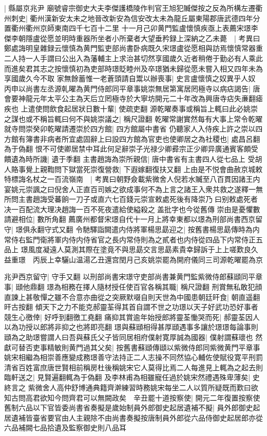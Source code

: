 |{
	縣屬京兆尹}
廟號睿宗御史大夫李傑護橋陵作判官王旭犯贓傑按之反為所構左遷衢州刺史|{
	衢州漢新安太未之地晉改新安為信安改太未為龍丘屬東陽郡唐武德四年分置衢州衢州京師東南四千七百十二里}
十一月己卯黄門監盧懷慎疾亟上表薦宋璟李傑李朝隱盧從愿並明時重器所坐者小所棄者大望垂矜録上深納之乙未薨　|{
	考異曰鄭處誨明皇雜録云懷慎為黄門監吏部尚書卧病既久宋璟盧從愿相與訪焉懷慎常器重二人持一人手謂曰公出入為藩輔主上求治甚切然享國歲久近者稍倦于勤必有人乘此而進矣君其志之按懷慎初為吏部時璟貶睦州及卒璟猶未歸從愿未嘗入相又四年未為享國歲久今不取}
家無餘蓄惟一老蒼頭請自鬻以辦喪事|{
	史言盧懷慎之奴異乎人奴}
丙申以尚書左丞源乹曜為黄門侍郎同平章事姚崇無居第寓居罔極寺以病痁謁告|{
	唐會要神龍元年太平公主為天后立罔極寺於大寧坊開元二十年改為興唐寺痁失亷翻瘧疾也}
上遣使問飲食起居狀日數十輩|{
	使疏吏翻}
源乾曜奏事或稱旨上輒曰此必姚崇之謀也或不稱旨輒曰何不與姚崇議之|{
	稱尺證翻}
乾曜常謝實然每有大事上常令乾曜就寺問崇癸卯乾曜請遷崇於四方館|{
	四方館屬中書省}
仍聽家人入侍疾上許之崇以四方館有簿書非病者所宜處固辭上曰設四方館為官吏也使卿居之為社稷也|{
	處昌呂翻為于偽翻}
恨不可使卿居禁中耳此何足辭崇子光禄少卿彛宗正少卿异廣通賓客頗受饋遺為時所譏|{
	遺于季翻}
主書趙誨為崇所親信|{
	唐中書省有主書四人從七品上}
受胡人賂事覺上親鞫問下獄當死崇復營救|{
	下遐嫁翻復扶又翻}
上由是不悦會曲赦京城敕特標誨名杖之一百流嶺南　|{
	考異曰朝野僉載紫微舍人倪若水贓至八百貫因諸王内宴姚元崇諷之曰倪舍人正直百司嫉之欲成事何不為上言之諸王入衆共救之遂釋一無所問主書趙誨受蕃餉一刀子或直六七百錢元崇宣敕處死後有降崇乃曰别敕處死者决一百配流大理决趙誨一百不死夜遣給使縊殺之盖批字也今從舊傳}
崇由是憂懼數請避相位|{
	數所角翻}
薦廣州都督宋璟自代十一月上將幸東都以璟為刑部尚書西京留守|{
	璟俱永翻守式又翻}
令馳驛詣闕遣内侍將軍楊思勗迎之|{
	按舊書楊思勗傳時為内常侍右監門衛將軍内侍内侍省官之長内常侍則為之貳者也内侍從四品下内常侍正五品上}
璟風度凝遠人莫測其際在塗竟不與思勗交言思勗素貴幸歸訴于上上嗟歎良久益重璟　丙辰上幸驪山温湯乙丑還宫閏月己亥姚崇罷為開府儀同三司源乾曜罷為京

兆尹西京留守|{
	守手又翻}
以刑部尚書宋璟守吏部尚書兼黄門監紫微侍郎蘇頲同平章事|{
	頲他鼎翻}
璟為相務在擇人隨材授任使百官各稱其職|{
	稱尺證翻}
刑賞無私敢犯顔直諫上甚敬憚之雖不合意亦曲從之突厥默啜自則天世為中國患朝廷旰食|{
	朝直遥翻旰古按翻}
傾天下之力不能克郝靈荃得其首自謂不世之功璟以天子好武功恐好事者競生心徼倖|{
	好呼到翻徼工堯翻}
痛抑其賞逾年始授郎將靈荃慟哭而死|{
	郝靈荃因人以為功授以郎將非抑之也將即亮翻}
璟與蘇頲相得甚厚頲遇事多讓於璟璟每論事則頲為之助璟嘗謂人曰吾與蘇氏父子皆同居相府僕射寛厚誠為國器|{
	僕射謂蘇瓌也}
然獻可替否吏事精敏則黄門過其父矣|{
	按舊書蘇頲傳頲以紫微侍郎同紫微黄門平章事}
姚宋相繼為相崇善應變成務璟善守法持正二人志操不同然協心輔佐使賦役寛平刑罰清省百姓富庶唐世賢相前稱房杜後稱姚宋它人莫得比焉二人每進見上輒為之起去則臨軒送之|{
	見賢遍翻輒為于偽翻}
及李林甫為相雖寵任過於姚宋然禮遇殊卑薄矣|{
	史終言之}
紫微舍人高仲舒博通典籍齊澣練習時務姚宋每坐二人以質所疑既而歎曰欲知古問高君欲知今問齊君可以無闕政矣　辛丑罷十道按察使|{
	開元二年復置按察使}
舊制六品以下官皆委尚書省奏擬是歲始制員外郎御史起居遺補不擬|{
	員外郎御史起居遺補皆臺省要官由人主親除不由尚書奏擬按唐制員外郎從六品侍御史起居郎亦從六品補闕七品拾遺及監察御史則八品耳}



